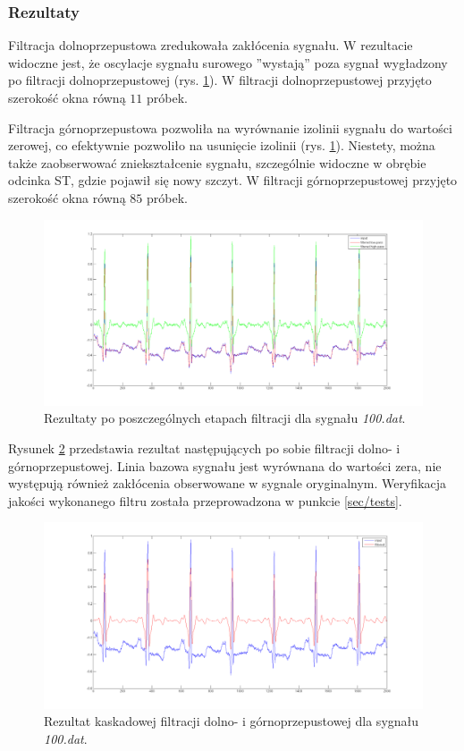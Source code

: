 \documentclass[a4paper]{article}
\begin{document}
\subsubsection{Rezultaty}

Filtracja dolnoprzepustowa zredukowała zakłócenia sygnału. W rezultacie widoczne jest, że oscylacje sygnału surowego ''wystają'' poza sygnał wygładzony po filtracji dolnoprzepustowej (rys. \ref{sg/filtered_by_type}). W filtracji dolnoprzepustowej przyjęto szerokość okna równą $11$ próbek.

Filtracja górnoprzepustowa pozwoliła na wyrównanie izolinii sygnału do wartości zerowej, co efektywnie pozwoliło na usunięcie izolinii (rys. \ref{sg/filtered_by_type}). Niestety, można także zaobserwować zniekształcenie sygnału, szczególnie widoczne w obrębie odcinka ST, gdzie pojawił się nowy szczyt. W filtracji górnoprzepustowej przyjęto szerokość okna równą $85$ próbek.

\begin{figure}[H]
\centering
\includegraphics[width=\linewidth]{sg/filtered_by_type}
\caption{\label{sg/filtered_by_type} Rezultaty po poszczególnych etapach filtracji dla sygnału \textit{100.dat}.}
\end{figure}

Rysunek \ref{sg/final_filtered} przedstawia rezultat następujących po sobie filtracji dolno- i górnoprzepustowej. Linia bazowa sygnału jest wyrównana do wartości zera, nie występują również zakłócenia obserwowane w sygnale oryginalnym. Weryfikacja jakości wykonanego filtru została przeprowadzona w punkcie \ref{sec/tests}.

\begin{figure}[H]
\centering
\includegraphics[width=\linewidth]{sg/filtered}
\caption{\label{sg/final_filtered} Rezultat kaskadowej filtracji dolno- i górnoprzepustowej dla sygnału \textit{100.dat}.}
\end{figure}
\end{document}
